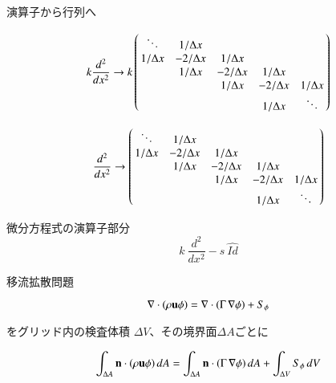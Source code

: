 \documentclass[a4j,11pt]{jarticle}
\begin{document}
演算子から行列へ
 

\[ k \frac{ d^2 }{ dx^2} \rightarrow  k \left( \begin{array}{@{\,}ccccc@{\,}} \ddots & 1 / \Delta x & & & \\ 1 / \Delta x & - 2 / \Delta x & 1 / \Delta x & & \\ & 1 / \Delta x & - 2 / \Delta x & 1 / \Delta x & \\ & & 1 / \Delta x & - 2 / \Delta x & 1 / \Delta x \\ & & & 1 / \Delta x & \ddots \end{array} \right)  \]


\[  \frac{ d^2 }{ dx^2} \rightarrow  \left( \begin{array}{@{\,}ccccc@{\,}} \ddots & 1 / \Delta x & & & \\ 1 / \Delta x & - 2 / \Delta x & 1 / \Delta x & & \\ & 1 / \Delta x & - 2 / \Delta x & 1 / \Delta x & \\ & & 1 / \Delta x & - 2 / \Delta x & 1 / \Delta x \\ & & & 1 / \Delta x & \ddots \end{array} \right)  \]


微分方程式の演算子部分
 \[  k\ \frac{d^2}{dx^2} - s\ \hat{Id} \]
 


移流拡散問題

\[ {\bf \nabla} \cdot ( \rho {\bf u} \phi) = {\bf \nabla} \cdot ( \Gamma \, {\bf \nabla} \phi )  + S_\phi \]

をグリッド内の検査体積 \(\Delta V\)、その境界面\(\Delta A\)ごとに

\[ \int_{\Delta A} {\bf n} \cdot ( \rho {\bf u} \phi )\, dA = \int_{\Delta A} {\bf n} \cdot ( \Gamma \,  {\bf \nabla} \phi )\, dA + \int_{\Delta V} S_\phi \,dV  \]
 
\end{document}

